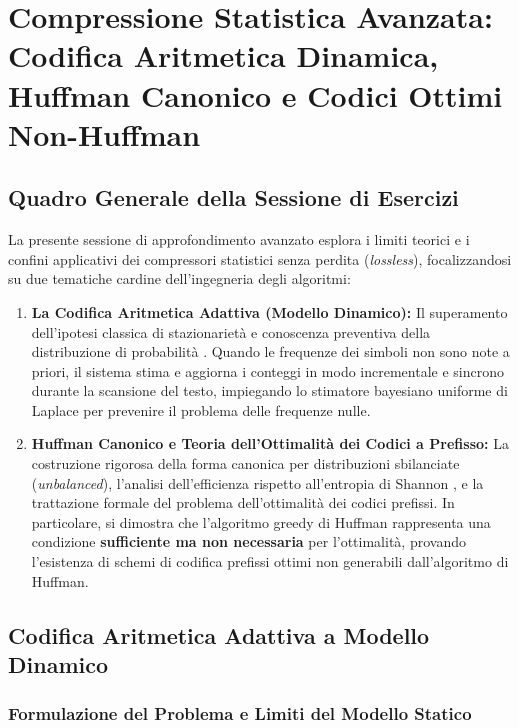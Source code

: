 \chapter[Compressione Avanzata: Aritmetica Dinamica e Codici Ottimi]{Compressione Statistica Avanzata: Codifica Aritmetica Dinamica, Huffman Canonico e Codici Ottimi Non-Huffman}
\label{ch:compressione-statistica-avanzata}

\section{Quadro Generale della Sessione di Esercizi}
\label{sec:quadro-generale-sessione-avanzata}

La presente sessione di approfondimento avanzato esplora i limiti teorici e i confini applicativi dei compressori statistici senza perdita (\textit{lossless}), focalizzandosi su due tematiche cardine dell'ingegneria degli algoritmi:
\begin{enumerate}
  \item \textbf{La Codifica Aritmetica Adattiva (Modello Dinamico):} Il superamento dell'ipotesi classica di stazionariet\`a e conoscenza preventiva della distribuzione di probabilit\`a \cite{rissanen1976, witten1987}. Quando le frequenze dei simboli non sono note a priori, il sistema stima e aggiorna i conteggi in modo incrementale e sincrono durante la scansione del testo, impiegando lo stimatore bayesiano uniforme di Laplace per prevenire il problema delle frequenze nulle.
  \item \textbf{Huffman Canonico e Teoria dell'Ottimalit\`a dei Codici a Prefisso:} La costruzione rigorosa della forma canonica per distribuzioni sbilanciate (\textit{unbalanced}), l'analisi dell'efficienza rispetto all'entropia di Shannon \cite{shannon1948}, e la trattazione formale del problema dell'ottimalit\`a dei codici prefissi. In particolare, si dimostra che l'algoritmo greedy di Huffman \cite{huffman1952} rappresenta una condizione \textbf{sufficiente ma non necessaria} per l'ottimalit\`a, provando l'esistenza di schemi di codifica prefissi ottimi non generabili dall'algoritmo di Huffman.
\end{enumerate}

\FloatBarrier
\section{Codifica Aritmetica Adattiva a Modello Dinamico}
\label{sec:aritmetica-adattiva-dinamica}

\subsection{Formulazione del Problema e Limiti del Modello Statico}
\label{subsec:formulazione-modello-dinamico}

